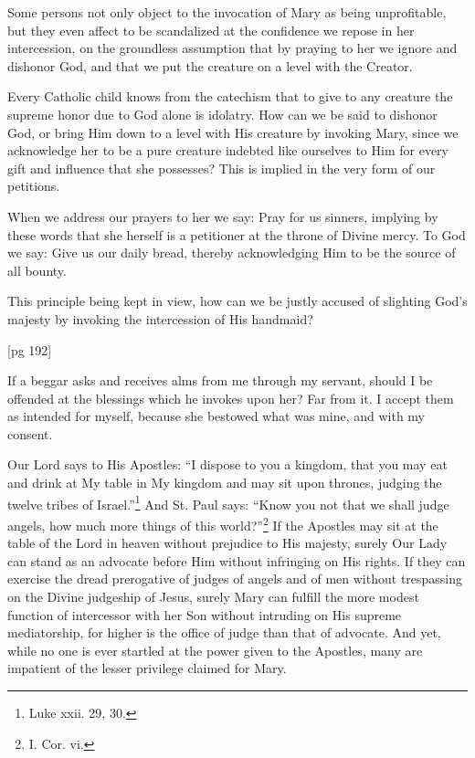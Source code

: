 Some persons not only object to the invocation
of Mary as being unprofitable, but they even affect
to be scandalized at the confidence we repose
in her intercession, on the groundless assumption
that by praying to her we ignore and
dishonor God, and that we put the creature on a
level with the Creator.

Every Catholic child knows from the catechism
that to give to any creature the supreme honor
due to God alone is idolatry. How can we be said
to dishonor God, or bring Him down to a level
with His creature by invoking Mary, since we acknowledge
her to be a pure creature indebted
like ourselves to Him for every gift and influence
that she possesses? This is implied in the very
form of our petitions.

When we address our prayers to her we say:
Pray for us sinners, implying by these words that
she herself is a petitioner at the throne of Divine
mercy. To God we say: Give us our daily bread,
thereby acknowledging Him to be the source of all
bounty.

This principle being kept in view, how can we
be justly accused of slighting God's majesty by
invoking the intercession of His handmaid?

[pg 192]

If a beggar asks and receives alms from me
through my servant, should I be offended at the
blessings which he invokes upon her? Far from
it. I accept them as intended for myself, because
she bestowed what was mine, and with my consent.

Our Lord says to His Apostles: “I dispose to
you a kingdom, that you may eat and drink at My
table in My kingdom and may sit upon thrones,
judging the twelve tribes of Israel.”\footnote{Luke
xxii. 29, 30.} And St.
Paul says: “Know you not that we shall judge
angels, how much more things of this world?”\footnote{I. Cor. vi.}
If the Apostles may sit at the table of the Lord
in heaven without prejudice to His majesty, surely
Our Lady can stand as an advocate before Him
without infringing on His rights. If they can
exercise the dread prerogative of judges of angels
and of men without trespassing on the Divine
judgeship of Jesus, surely Mary can fulfill the
more modest function of intercessor with her Son
without intruding on His supreme mediatorship,
for higher is the office of judge than that of advocate.
And yet, while no one is ever startled
at the power given to the Apostles, many are impatient
of the lesser privilege claimed for Mary.


